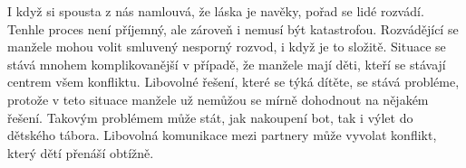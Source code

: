 







I když si spousta z nás namlouvá, že láska je navěky, pořad se lidé rozvádí. Tenhle proces není příjemný, ale zároveň i nemusí být katastrofou. Rozvádějící se manžele mohou volit smluvený nesporný rozvod, i když je to složitě. Situace se stává mnohem komplikovanější v případě, že manžele mají děti, kteří se stávají centrem všem konfliktu. Libovolné řešení, které se týká dítěte, se stává probléme, protože v teto situace manžele už nemůžou se mírně dohodnout na nějakém řešení. Takovým problémem může stát, jak nakoupení bot, tak i výlet do dětského tábora. Libovolná komunikace mezi partnery může vyvolat konflikt, který dětí přenáší obtížně.

